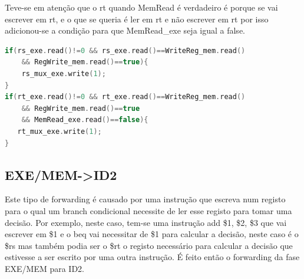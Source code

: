 \documentclass[pdftex,12pt,a4paper]{report}
\begin{document}
Teve-se em atenção que o rt quando MemRead é verdadeiro é porque se vai escrever em rt, e o que se queria é ler em rt e não escrever em rt por isso adicionou-se a condição para que MemRead\_exe seja igual a false.
\linebreak

\begin{lstlisting}[language=c]
if(rs_exe.read()!=0 && rs_exe.read()==WriteReg_mem.read() 
	&& RegWrite_mem.read()==true){
    rs_mux_exe.write(1); 
}
if(rt_exe.read()!=0 && rt_exe.read()==WriteReg_mem.read() 
	&& RegWrite_mem.read()==true 
	&& MemRead_exe.read()==false){
   rt_mux_exe.write(1);
}
\end{lstlisting} 

\subsection{EXE/MEM->ID2}

\begin{table}[!htb]
\centering
\label{table_exe_mem_id2}
\end{table}

Este tipo de forwarding é causado por uma instrução que escreva num registo para o qual um branch condicional necessite de ler esse registo para tomar uma decisão. Por exemplo, neste caso, tem-se uma instrução add \$1, \$2, \$3 que vai escrever em \$1 e o beq vai necessitar de \$1 para calcular a decisão, neste caso é o \$rs mas também podia ser o \$rt o registo necessário para calcular a decisão que estivesse a ser escrito por uma outra instrução. É feito então o forwarding da fase EXE/MEM para ID2.
\end{document}
